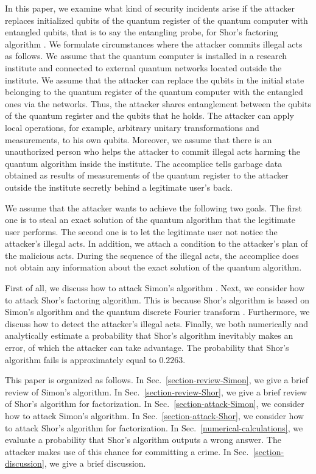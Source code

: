 \documentclass[12pt]{article}
\begin{document}
In this paper,
we examine what kind of security incidents arise if the attacker replaces initialized qubits of the quantum register of the quantum computer with entangled qubits,
that is to say the entangling probe,
for Shor's factoring algorithm
\cite{Shor1997,Ekert1996}.
We formulate circumstances where the attacker commits illegal acts as follows.
We assume that the quantum computer is installed in a research institute and connected to external quantum networks located outside the institute.
We assume that the attacker can replace the qubits in the initial state belonging to the quantum register of the quantum computer with the entangled ones
via the networks.
Thus, the attacker shares entanglement between the qubits of the quantum register and the qubits that he holds.
The attacker can apply local operations,
for example,
arbitrary unitary transformations and measurements,
to his own qubits.
Moreover,
we assume that there is an unauthorized person who helps the attacker to commit illegal acts harming the quantum algorithm inside the institute.
The accomplice tells garbage data obtained as results of measurements of the quantum register to the attacker outside the institute secretly
behind a legitimate user's back.

We assume that the attacker wants to achieve the following two goals.
The first one is to steal an exact solution of the quantum algorithm that the legitimate user performs.
The second one is to let the legitimate user not notice the attacker's illegal acts.
In addition,
we attach a condition to the attacker's plan of the malicious acts.
During the sequence of the illegal acts,
the accomplice does not obtain any information about the exact solution of the quantum algorithm.

First of all,
we discuss how to attack Simon's algorithm
\cite{Simon1997,Aharonov1999}.
Next,
we consider how to attack Shor's factoring algorithm.
This is because Shor's algorithm is based on Simon's algorithm and the quantum discrete Fourier transform
\cite{Coppersmith1994}.
Furthermore,
we discuss how to detect the attacker's illegal acts.
Finally,
we both numerically and analytically estimate a probability that Shor's algorithm inevitably makes an error,
of which the attacker can take advantage.
The probability that Shor's algorithm fails is approximately equal to $0.2263$.

This paper is organized as follows.
In Sec.~\ref{section-review-Simon},
we give a brief review of Simon's algorithm.
In Sec.~\ref{section-review-Shor},
we give a brief review of Shor's algorithm for factorization.
In Sec.~\ref{section-attack-Simon},
we consider how to attack Simon's algorithm.
In Sec.~\ref{section-attack-Shor},
we consider how to attack Shor's algorithm for factorization.
In Sec.~\ref{numerical-calculations},
we evaluate a probability that Shor's algorithm outputs a wrong answer.
The attacker makes use of this chance for committing a crime.
In Sec.~\ref{section-discussion},
we give a brief discussion.
\end{document}
